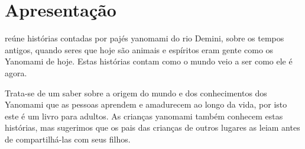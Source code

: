 
\chapter{Apresentação}

 reúne histórias contadas por pajés yanomami do rio Demini,
sobre os tempos antigos, quando seres que hoje são animais e espíritos eram
gente como os Yanomami de hoje. Estas histórias contam como o mundo veio a ser
como ele é agora. 

Trata-se de um saber sobre a origem do mundo e dos conhecimentos dos Yanomami
que as pessoas aprendem e amadurecem ao longo da vida, por isto este é um livro
para adultos. As crianças yanomami também conhecem estas histórias, mas
sugerimos que os pais das crianças de outros lugares as leiam antes de
compartilhá-las com seus filhos.
